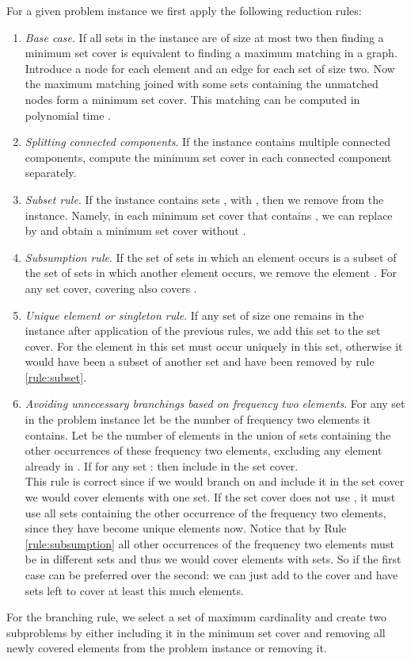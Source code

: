 \documentclass[fleqn]{stacs_proc}
\begin{document}
For a given problem instance we first apply the following reduction rules:
\begin{enumerate}
\item {\em Base case}. \label{rule:matching}
	  If all sets in the instance are of size at most two then finding
	  a minimum set cover is equivalent to finding a maximum matching in a graph.
	  Introduce a node for each element and an edge for each set of size two.
	  Now the maximum matching joined with some sets containing the unmatched nodes
	  form a minimum set cover. This matching can be computed in polynomial time \cite{Edmonds65}.
\item {\em Splitting connected components}. \label{rule:component}
		If the instance contains multiple connected components, compute the minimum set cover in each connected component separately.
\item {\em Subset rule}. \label{rule:subset}
	  If the instance contains sets ,  with ,
	  then we remove  from the instance. Namely, in each minimum set
	  cover that contains , we can replace  by  and obtain
	  a minimum set cover without .
\item {\em Subsumption rule}. \label{rule:subsumption}
	  If the set of sets  in which an element  occurs is a subset of the set of sets 
	  in which another element  occurs, we remove the element .
	  For any set cover, covering  also covers .
\item {\em Unique element or singleton rule}.
	  If any set of size one remains in the instance after application of the previous rules, 
	  we add this set to the set cover. For the element in this set must occur uniquely in this set,
	  otherwise it would have been a subset of another set and have been removed by rule \ref{rule:subset}.
\item {\em Avoiding unnecessary branchings based on frequency two elements}. \label{rule:special}
	  For any set  in the problem instance let  be the number of frequency two elements it contains.
	  Let  be the number of elements in the union of sets containing the other occurrences of these
	  frequency two elements, excluding any element already in .
	  If for any set :  then include  in the set cover. \\
	  This rule is correct since if we would branch on  and include it in the set cover we would
	  cover  elements with one set. If the set cover does not use ,
	  it must use 
	  all sets containing the other occurrence of the frequency two elements,
	  since they have become unique elements now. Notice that by Rule \ref{rule:subsumption}
	  all other occurrences of the frequency two elements must be in different sets and
	  thus we would cover  elements with  sets.
	  So if  the first case can be preferred over the second: we can just add  to the
	  cover and have  sets left to cover at least this much elements.
\end{enumerate}
For the branching rule, we select a set of maximum cardinality and
create two subproblems by either including it in the minimum set cover and removing all
newly covered elements from the problem instance or removing it.
\end{document}
